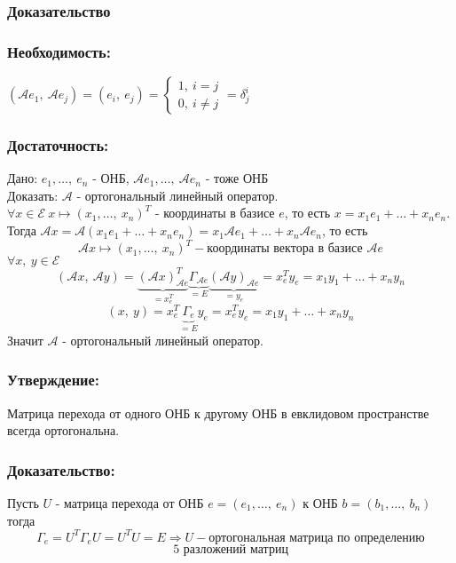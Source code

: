 \documentclass[12pt, letterpaper, twoside]{article}
\begin{document}
    \subsubsection*{Доказательство}
    \subsubsection*{Необходимость:}
    $(\mathcal{A}e_1,\ \mathcal{A}e_j) = (e_i,\ e_j) = \begin{cases}
        1,\ i = j\\
        0,\ i\neq j
    \end{cases} = \delta^i_j$
    \subsubsection*{Достаточность:}
    Дано: $e_1,\dots,\ e_n$ - ОНБ, $\mathcal{A}e_1,\dots,\ \mathcal{A}e_n$ - тоже ОНБ\\
    Доказать: $\mathcal{A}$ - ортогональный линейный оператор.\\
    $\forall x\in \mathcal{E}\ x\longmapsto (x_1,\dots,\ x_n)^T$ - координаты в базисе $e$, то есть $x = x_1 e_1 + \dots + x_n e_n$.\\
    Тогда $\mathcal{A} x = \mathcal{A}(x_1 e_1 + \dots + x_n e_n) = x_1 \mathcal{A} e_1 + \dots + x_n \mathcal{A} e_n$, то есть
    \[\mathcal{A} x \longmapsto (x_1,\dots,\ x_n)^T - \text{координаты вектора в базисе $\mathcal{A} e$}\]
    $\forall x,\ y\in \mathcal{E}$
    \[(\mathcal{A} x,\ \mathcal{A} y) = \underset{=x_e^T}{\underbrace{(\mathcal{A} x)^T_{\mathcal{A} e}}} \underset{=E}{\underbrace{\Gamma_{\mathcal{A} e}}} \underset{=y_e}{\underbrace{(\mathcal{A} y)_{\mathcal{A} e}}} = x^T_e y_e = x_1 y_1 +\dots + x_n y_n\]
    \[(x,\ y) = x^T_e \underset{=E}{\underbrace{\Gamma_e}} y_e = x_e^T y_e = x_1 y_1 +\dots + x_n y_n\]
    Значит $\mathcal{A}$ - ортогональный линейный оператор.

    \subsubsection*{Утверждение:}
    Матрица перехода от одного ОНБ к другому ОНБ в евклидовом пространстве всегда ортогональна.

    \subsubsection*{Доказательство:}
    Пусть $U$ - матрица перехода от ОНБ $e = (e_1,\dots,\ e_n)$ к ОНБ $b = (b_1,\dots,\ b_n)$\\
    тогда
    \[\Gamma_e = U^T \Gamma_e U = U^T U = E\Rightarrow U - \text{ортогональная матрица по определению}\]
    \[\text{5 разложений матриц}\]
\end{document}
